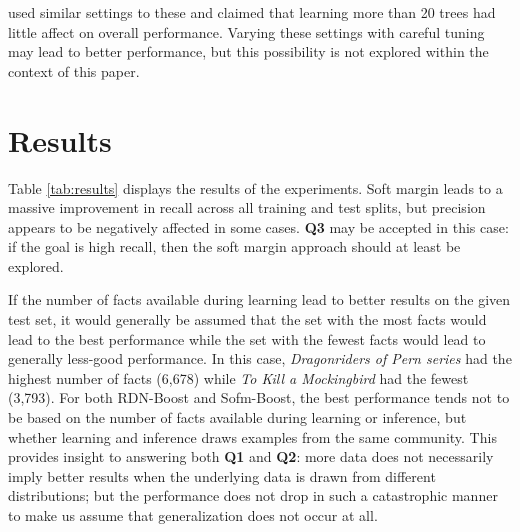 \documentclass[letterpaper]{article}
\begin{document}
\cite{yang2017combining} used similar settings to these and claimed that learning more than 20 trees had little affect on overall performance. Varying these settings with careful tuning may lead to better performance, but this possibility is not explored within the context of this paper.

\section{Results}


Table \ref{tab:results} displays the results of the experiments. Soft margin leads to a massive improvement in recall across all training and test splits, but precision appears to be negatively affected in some cases. \textbf{Q3} may be accepted in this case: if the goal is high recall, then the soft margin approach should at least be explored.

If the number of facts available during learning lead to better results on the given test set, it would generally be assumed that the set with the most facts would lead to the best performance while the set with the fewest facts would lead to generally less-good performance. In this case, \textit{Dragonriders of Pern series} had the highest number of facts (6,678) while \textit{To Kill a Mockingbird} had the fewest (3,793). For both RDN-Boost and Sofm-Boost, the best performance tends not to be based on the number of facts available during learning or inference, but whether learning and inference draws examples from the same community. This provides insight to answering both \textbf{Q1} and \textbf{Q2}: more data does not necessarily imply better results when the underlying data is drawn from different distributions; but the performance does not drop in such a catastrophic manner to make us assume that generalization does not occur at all.
\end{document}
